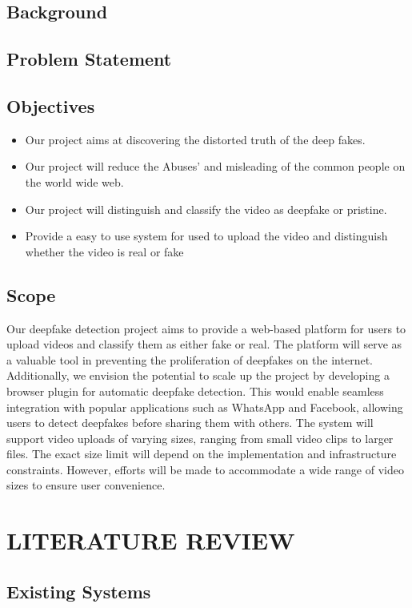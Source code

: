 \documentclass[12 pt]{article}
\begin{document}
\subsection{Background}
\newpage
\subsection{Problem Statement}
\newpage
\subsection{Objectives}
\justify
\begin{itemize}
    \item Our project aims at discovering the distorted truth of the deep fakes.
    \item Our project will reduce the Abuses’ and misleading of the common people on
          the world wide web.
    \item Our project will distinguish and classify the video as deepfake or pristine.
    \item Provide a easy to use system for used to upload the video and distinguish
          whether the video is real or fake
\end{itemize}
\newpage
\subsection{Scope}
Our deepfake detection project aims to provide a web-based platform for users to upload videos and classify them as either fake or real. The platform will serve as a valuable tool in preventing the proliferation of deepfakes on the internet. Additionally, we envision the potential to scale up the project by developing a browser plugin for automatic deepfake detection. This would enable seamless integration with popular applications such as WhatsApp and Facebook, allowing users to detect deepfakes before sharing them with others.
The system will support video uploads of varying sizes, ranging from small video clips to larger files. The exact size limit will depend on the implementation and infrastructure constraints. However, efforts will be made to accommodate a wide range of video sizes to ensure user convenience.
\newpage


\section{LITERATURE REVIEW}
\newpage
\subsection{Existing Systems}
\newpage
\end{document}

